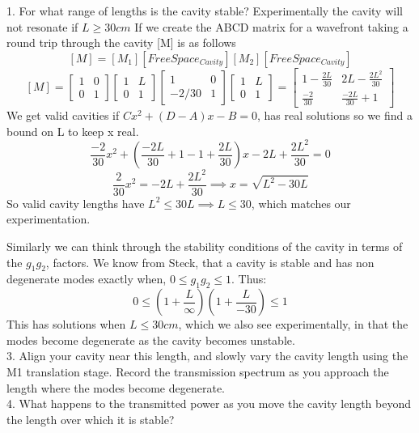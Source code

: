 \documentclass[11pt]{article}
\begin{document}
1. For what range of lengths is the cavity stable?
Experimentally the cavity will not resonate if $L \geq 30cm$
If we create the ABCD matrix for a wavefront taking a round trip through the cavity [M] is as follows
$$ [M] = [M_1][FreeSpace_{Cavity}][M_2][FreeSpace_{Cavity}]$$
$$ [M] = \begin{bmatrix} 1 & 0 \\ 0 & 1  \end{bmatrix}  \begin{bmatrix}1 & L \\0 & 1 \end{bmatrix} \begin{bmatrix} 1 & 0 \\ -2/30 & 1  \end{bmatrix} \begin{bmatrix} 1 & L \\ 0 & 1  \end{bmatrix} = \begin{bmatrix} 1 - \frac{2L}{30} & 2L - \frac{2L^2}{30} \\ \frac{-2}{30} & \frac{-2L}{30} + 1  \end{bmatrix}$$
We get valid cavities if $Cx^2 + (D-A)x - B = 0$, has real solutions so we find a bound on L to keep x real. 
$$ \frac{-2}{30}x^2 + (\frac{-2L}{30} + 1 - 1 + \frac{2L}{30} )x - 2L + \frac{2L^2}{30} = 0 $$
$$ \frac{2}{30}x^2 = -2L + \frac{2L^2}{30} \implies x = \sqrt{L^2 - 30L}$$
So valid cavity lengths have $L^2 \leq 30L \implies L \leq 30 $, which matches our experimentation.

Similarly we can think through the stability conditions of the cavity in terms of the $g_1g_2$, factors. We know from Steck, that a cavity is stable and has non degenerate modes exactly when, $0 \leq g_1g_2 \leq 1$. Thus: \\
$$0 \leq (1+\frac{L}{\infty})(1+\frac{L}{-30}) \leq 1 $$ This has solutions when $L \leq 30 cm$, which we also see experimentally, in that the modes become degenerate as the cavity becomes unstable. \\

3. Align your cavity near this length, and slowly vary the cavity length using the M1 translation stage. Record the transmission spectrum as you approach the length where the modes become degenerate. \\

4. What happens to the transmitted power as you move the cavity length beyond the length over which it is stable?
\end{document}
